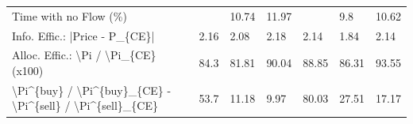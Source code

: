 \begin{tabular}{lllllll}
 Time with no Flow (\%)                                     &          & 10.74    & 11.97    &           & 9.8       & 10.62     \\
 Info. Effic.: |Price - P\_\{CE\}|                            & 2.16     & 2.08     & 2.18     & 2.14      & 1.84      & 2.14      \\
 Alloc. Effic.: \textbackslash{}Pi / \textbackslash{}Pi\_\{CE\} (x100)                      & 84.3     & 81.81    & 90.04    & 88.85     & 86.31     & 93.55     \\
 \textbackslash{}Pi\^{}\{buy\} / \textbackslash{}Pi\^{}\{buy\}\_\{CE\} - \textbackslash{}Pi\^{}\{sell\} / \textbackslash{}Pi\^{}\{sell\}\_\{CE\} & 53.7     & 11.18    & 9.97     & 80.03     & 27.51     & 17.17     \\
\hline
\end{tabular}